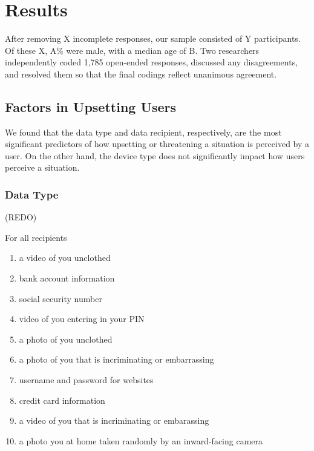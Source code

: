 \documentclass{acm_proc_article-sp}
\begin{document}

\section{Results}
After removing X incomplete responses, our sample consisted of Y participants. Of these X, A\% were male, with a median age of B. Two researchers independently coded 1,785 open-ended responses, discussed any disagreements, and resolved them so that the final codings reflect unanimous agreement. 

\subsection{Factors in Upsetting Users}
We found that the data type and data recipient, respectively, are the most significant predictors of how upsetting or threatening a situation is perceived by a user. On the other hand, the device type does not significantly impact how users perceive a situation.

\subsubsection{Data Type}
(REDO) 

For all recipients \\[-.8cm]

\begin{enumerate} \itemsep1pt \parskip0pt 
  \item a video of you unclothed
  \item bank account information
  \item social security number
  \item video of you entering in your PIN
  \item a photo of you unclothed
  \item a photo of you that is incriminating or embarrassing
  \item username and password for websites
  \item credit card information
  \item a video of you that is incriminating or embarassing
  \item a photo you at home taken randomly by an inward-facing camera \\[-.8cm]
\end{enumerate}
\end{document}
